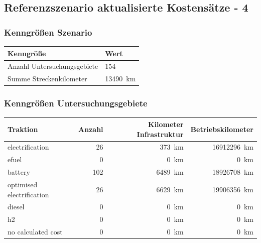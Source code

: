\subsection{Referenzszenario aktualisierte Kostensätze - 4}

\subsubsection{Kenngrößen Szenario}

\begin{center}
	\begin{tabularx}{\textwidth}{l | X } Kenngröße & Wert \\
	\hline
	Anzahl Untersuchungsgebiete & \num{154} \\
	Summe Streckenkilometer & \SI{13490}{\km}
	\end{tabularx}
\end{center}

\subsubsection{Kenngrößen Untersuchungsgebiete}
\begin{center}
	\begin{tabularx}{\textwidth}{X | r | r | r} Traktion & Anzahl & Kilometer Infrastruktur & Betriebskilometer \\
	\hline
            electrification & \num{26} &  \SI{373}{\km} & \SI{16912296}{\km}\\
            efuel & \num{0} &  \SI{0}{\km} & \SI{0}{\km}\\
            battery & \num{102} &  \SI{6489}{\km} & \SI{18926708}{\km}\\
            optimised electrification & \num{26} &  \SI{6629}{\km} & \SI{19906356}{\km}\\
            diesel & \num{0} &  \SI{0}{\km} & \SI{0}{\km}\\
            h2 & \num{0} &  \SI{0}{\km} & \SI{0}{\km}\\
            no calculated cost & \num{0} &  \SI{0}{\km} & \SI{0}{\km}\\
    	\end{tabularx}
\end{center}

